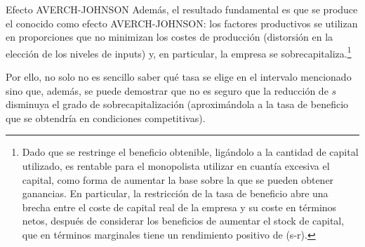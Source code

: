 \documentclass[10pt,a4paper]{article}
\begin{document}
{Efecto AVERCH-JOHNSON}
Además, el resultado fundamental es que se produce el conocido como efecto AVERCH-JOHNSON: los factores productivos se utilizan en proporciones que no minimizan los costes de producción (distorsión en la elección de los niveles de inputs) y, en particular, la empresa se sobrecapitaliza.\footnote{%
    Dado que se restringe el beneficio obtenible, ligándolo a la cantidad de capital utilizado, es rentable para el monopolista utilizar en cuantía excesiva el capital, como forma de aumentar la base sobre la que se pueden obtener ganancias.
En particular, la restricción de la tasa de beneficio abre una brecha entre el coste de capital real de la empresa y su coste en términos netos, después de considerar los beneficios de aumentar el stock de capital, que en términos marginales tiene un rendimiento positivo de (s-r).
}

Por ello, no solo no es sencillo saber qué tasa se elige en el intervalo mencionado sino que, además, se puede demostrar que no es seguro que la reducción de $s$ disminuya el grado de sobrecapitalización (aproximándola a la tasa de beneficio que se obtendría en condiciones competitivas).
\end{document}
